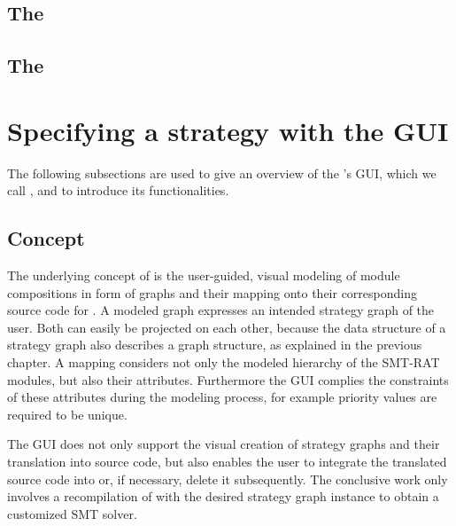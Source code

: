 \subsection{The \vsModuleClass}

\subsection{The \cadModuleClass}


\section{Specifying a strategy with the GUI}

The following subsections are used to give an overview of the 
 \smtrat's GUI, which we call \smtxrat, and to introduce its functionalities.

\subsection{Concept}
\label{sec:concept_of_smt-xrat}
The underlying concept of \smtxrat is the user-guided, visual 
modeling of module compositions in form of graphs and their 
mapping onto their corresponding source code for \smtrat. A 
modeled graph expresses an intended strategy graph of the user. 
Both can easily be projected on each other, because the data 
structure of a strategy graph also describes a graph structure, 
as explained in the previous chapter. A mapping considers not 
only the modeled hierarchy of the SMT-RAT modules, but also 
their attributes. Furthermore the GUI complies the constraints 
of these attributes during the modeling process, for example 
priority values are required to be unique.

The GUI does not only support the visual creation of strategy 
graphs and their translation into source code, but also enables 
the user to integrate the translated source code into \smtrat or, 
if necessary, delete it subsequently. The conclusive work only 
involves a recompilation of \smtrat with the desired strategy 
graph instance to obtain a customized SMT solver.

